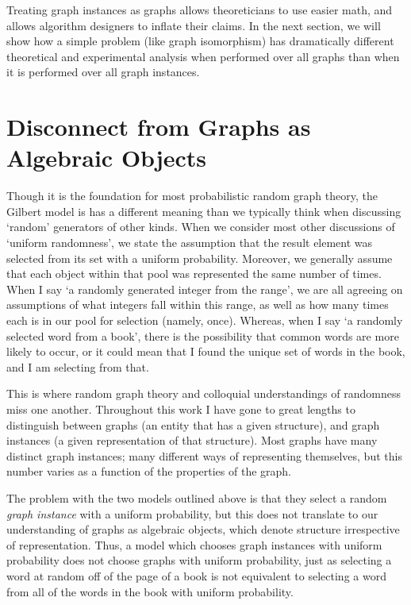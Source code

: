 \documentclass[11pt,a4paper]{report}
\begin{document}
Treating graph instances as graphs allows theoreticians to use easier math, and allows algorithm designers to inflate their claims.
In the next section, we will show how a simple problem (like graph isomorphism) has dramatically different theoretical and experimental analysis when performed over all graphs than when it is performed over all graph instances.


\section{Disconnect from Graphs as Algebraic Objects}

Though it is the foundation for most probabilistic random graph theory, the Gilbert model is has a different meaning than we typically think when discussing `random' generators of other kinds.
When we consider most other discussions of `uniform randomness', we state the assumption that the result element was selected from its set with a uniform probability.
Moreover, we generally assume that each object within that pool was represented the same number of times.
When I say `a randomly generated integer from the range', we are all agreeing on assumptions of what integers fall within this range, as well as how many times each is in our pool for selection (namely, once). 
Whereas, when I say `a randomly selected word from a book', there is the possibility that common words are more likely to occur, or it could mean that I found the unique set of words in the book, and I am selecting from that.

This is where random graph theory and colloquial understandings of randomness miss one another.
Throughout this work I have gone to great lengths to distinguish between graphs (an entity that has a given structure), and graph instances (a given representation of that structure).
Most graphs have many distinct graph instances; many different ways of representing themselves, but this number varies as a function of the properties of the graph.

The problem with the two models outlined above is that they select a random \emph{graph instance} with a uniform probability, but this does not translate to our understanding of graphs as algebraic objects, which denote structure irrespective of representation.
Thus, a model which chooses graph instances with uniform probability does not choose graphs with uniform probability, just as selecting a word at random off of the page of a book is not equivalent to selecting a word from all of the words in the book with uniform probability.
\end{document}
